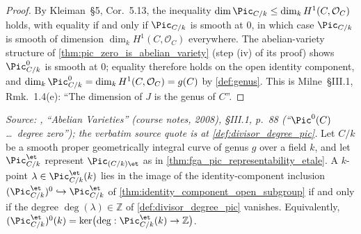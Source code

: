 \begin{proof}
  By Kleiman~\S 5,
  Cor.~5.13, the inequality
  \(\dim \Pic_{C/k} \le \dim_k H^1(C, \mathcal{O}_C)\) holds, with
  equality if and only if \(\Pic_{C/k}\) is smooth at \(0\), in which
  case \(\Pic_{C/k}\) is smooth of dimension \(\dim_k H^1(C,
  \mathcal{O}_C)\) everywhere. The abelian-variety structure of
  \cref{thm:pic_zero_is_abelian_variety} (step (iv) of its proof)
  shows \(\Pic^0_{C/k}\) is smooth at \(0\); equality therefore holds
  on the open identity component, and
  \(\dim_k \Pic^0_{C/k} = \dim_k H^1(C, \mathcal{O}_C) = g(C)\)
  by \cref{def:genus}. This is Milne~\S III.1, Rmk.~1.4(e): ``The
  dimension of \(J\) is the genus of \(C\)''.
\end{proof}

\begin{theorem}\notready
  \label{thm:pic_zero_k_points_iff_degree_zero}

  \textit{Source: \cite{milne-av}, ``Abelian Varieties'' (course notes, 2008),
  \S III.1, p.~88 (``\(\Pic^0(C)\)\dots\ degree zero''); the verbatim
  source quote is at \cref{def:divisor_degree_pic}.}
  Let \(C/k\) be a smooth proper geometrically integral curve of genus
  \(g\) over a field \(k\), and let \(\Pic^{\et}_{C/k}\) represent
  \(\Pic_{(C/k)\et}\) as in \cref{thm:fga_pic_representability_etale}. A
  \(k\)-point \(\lambda \in \Pic^{\et}_{C/k}(k)\) lies in the image of the
  identity-component inclusion
  \((\Pic^{\et}_{C/k})^0\hookrightarrow\Pic^{\et}_{C/k}\)
  of \cref{thm:identity_component_open_subgroup}
  if and only if the degree
  \(\deg(\lambda) \in \mathbb{Z}\) of \cref{def:divisor_degree_pic}
  vanishes. Equivalently,
  \((\Pic^{\et}_{C/k})^0(k)
    =\ker\bigl(\deg:\Pic^{\et}_{C/k}(k)\to\mathbb Z\bigr)\).
\end{theorem}


